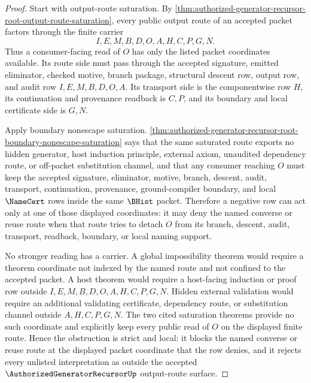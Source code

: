 \begin{proof}
Start with output-route saturation. By \autoref{thm:authorized-generator-recursor-root-output-route-saturation}, every public output route of an accepted packet factors through the finite carrier
$$
I,E,M,B,D,O,A,H,C,P,G,N.
$$
Thus a consumer-facing read of $O$ has only the listed packet coordinates available. Its route side must pass through the accepted signature, emitted eliminator, checked motive, branch package, structural descent row, output row, and audit row $I,E,M,B,D,O,A$. Its transport side is the componentwise row $H$, its continuation and provenance readback is $C,P$, and its boundary and local certificate side is $G,N$.

Apply boundary nonescape saturation. \autoref{thm:authorized-generator-recursor-root-boundary-nonescape-saturation} says that the same saturated route exports no hidden generator, host induction principle, external axiom, unaudited dependency route, or off-packet substitution channel, and that any consumer reaching $O$ must keep the accepted signature, eliminator, motive, branch, descent, audit, transport, continuation, provenance, ground-compiler boundary, and local $\NameCert$ rows inside the same $\BHist$ packet. Therefore a negative row can act only at one of those displayed coordinates: it may deny the named converse or reuse route when that route tries to detach $O$ from its branch, descent, audit, transport, readback, boundary, or local naming support.

No stronger reading has a carrier. A global impossibility theorem would require a theorem coordinate not indexed by the named route and not confined to the accepted packet. A host theorem would require a host-facing induction or proof row outside $I,E,M,B,D,O,A,H,C,P,G,N$. Hidden external validation would require an additional validating certificate, dependency route, or substitution channel outside $A,H,C,P,G,N$. The two cited saturation theorems provide no such coordinate and explicitly keep every public read of $O$ on the displayed finite route. Hence the obstruction is strict and local: it blocks the named converse or reuse route at the displayed packet coordinate that the row denies, and it rejects every unlisted interpretation as outside the accepted $\AuthorizedGeneratorRecursorUp$ output-route surface.
\end{proof}
